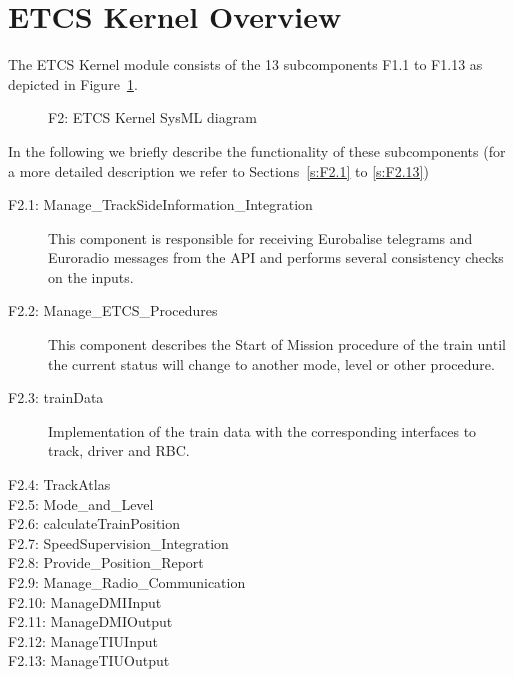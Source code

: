 \section{ETCS Kernel Overview}\label{s:ETCS_Kernel_Overview}

The ETCS Kernel module consists of the 13 subcomponents F1.1 to F1.13 as depicted in Figure~\ref{f:ETCS_Kernel}. 
\begin{figure}
\center
{}
\caption{F2: ETCS Kernel SysML diagram}\label{f:ETCS_Kernel}
\end{figure}
In the following we briefly describe the functionality of these subcomponents (for a more detailed description we refer to Sections~\ref{s:F2.1} to \ref{s:F2.13})
\begin{description}
\item[F2.1: Manage\_TrackSideInformation\_Integration] This component is responsible for receiving Eurobalise telegrams and Euroradio messages from the API and performs several consistency checks on the inputs.
\item[F2.2: Manage\_ETCS\_Procedures] This component describes the Start of Mission procedure of the train until the current status will change to another mode, level or other procedure.
\item[F2.3: trainData] Implementation of the train data with the corresponding interfaces to track, driver and RBC.
\item[F2.4: TrackAtlas] 
\item[F2.5: Mode\_and\_Level] 
\item[F2.6: calculateTrainPosition] 
\item[F2.7: SpeedSupervision\_Integration] 
\item[F2.8: Provide\_Position\_Report] 
\item[F2.9: Manage\_Radio\_Communication] 
\item[F2.10: ManageDMIInput] 
\item[F2.11: ManageDMIOutput] 
\item[F2.12: ManageTIUInput] 
\item[F2.13: ManageTIUOutput] 
\end{description}


